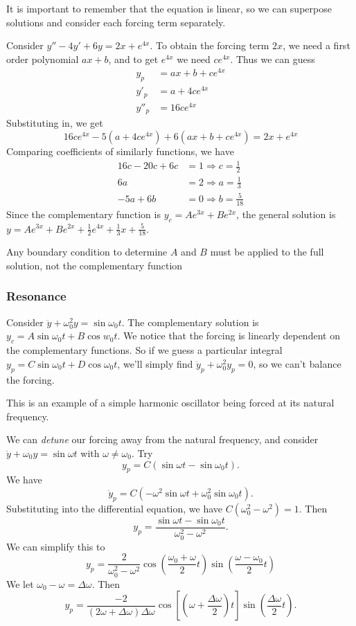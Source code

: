 \documentclass[a4paper]{article}
\begin{document}
  It is important to remember that the equation is linear, so we can superpose solutions and consider each forcing term separately.

  \begin{eg}
    Consider $y'' - 4y' + 6y = 2x + e^{4x}$. To obtain the forcing term $2x$, we need a first order polynomial $ax + b$, and to get $e^{4x}$ we need $ce^{4x}$. Thus we can guess
    \begin{align*}
      y_p &= ax + b + ce^{4x}\\
      y'_p &= a + 4ce^{4x}\\
      y''_p &= 16ce^{4x}
    \end{align*}
    Substituting in, we get
    \[
      16ce^{4x} - 5(a + 4ce^{4x}) + 6(ax + b + ce^{4x}) = 2x + e^{4x}
    \]
    Comparing coefficients of similarly functions, we have
    \begin{align*}
      16c - 20c + 6c &= 1\Rightarrow c = \frac{1}{2}\\
      6a &= 2 \Rightarrow a = \frac{1}{3}\\
      -5a + 6b &= 0 \Rightarrow b = \frac{5}{18}
    \end{align*}
    Since the complementary function is $y_c = Ae^{3x} + Be^{2x}$, the general solution is $y = Ae^{3x} + Be^{2x} + \frac{1}{2}e^{4x} + \frac{1}{3}x + \frac{5}{18}$.

    \note Any boundary condition to determine $A$ and $B$ must be applied to the full solution, not the complementary function
  \end{eg}
  \subsubsection{Resonance}
  Consider $\ddot y + \omega_0^2 y = \sin \omega_0 t$. The complementary solution is $y_c = A\sin \omega_0 t + B\cos w_0 t$. We notice that the forcing is linearly dependent on the complementary functions. So if we guess a particular integral $y_p = C\sin \omega_0 t + D\cos \omega_0 t$, we'll simply find $\ddot y_p + \omega_0 ^2 y_p = 0$, so we can't balance the forcing.

  \note This is an example of a simple harmonic oscillator being forced at its natural frequency.

  We can \emph{detune} our forcing away from the natural frequency, and consider $\ddot y + \omega_0 y = \sin \omega t$ with $\omega \not= \omega_0$. Try
  \[
    y_p = C(\sin \omega t - \sin \omega_0 t).
  \]
  We have
  \[
    \ddot y_p = C(-\omega^2 \sin \omega t + \omega_0^2 \sin\omega_0 t).
  \]
  Substituting into the differential equation, we have $C(\omega_0^2 - \omega^2) = 1$. Then 
  \[
    y_p = \frac{\sin \omega t - \sin \omega_0t}{\omega_0^2 - \omega^2}.
  \]
  We can simplify this to 
  \[
    y_p = \frac{2}{\omega_0^2 - \omega^2} \cos \left(\frac{\omega_0 + \omega}{2}t\right) \sin \left(\frac{\omega - \omega_0}{2} t\right)
  \]
  We let $\omega_0 - \omega = \Delta \omega$. Then
  \[
    y_p = \frac{-2}{(2\omega + \Delta \omega)\Delta \omega}\cos \left[\left(\omega + \frac{\Delta \omega}{2}\right)t\right] \sin \left(\frac{\Delta \omega}{2}t\right).
  \]
\end{document}
